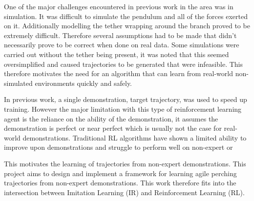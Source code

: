 One of the major challenges encountered in previous work in the area was in simulation.
It was difficult to simulate the pendulum and all of the forces exerted on it.
Additionally modelling the tether wrapping around the branch proved to be extremely difficult.
Therefore several assumptions had to be made that didn't necessarily prove to be correct when done on real data.
Some simulations were carried out without the tether being present, it was noted that this seemed oversimplified and caused trajectories to be generated that were infeasible.
This therefore motivates the need for an algorithm that can learn from real-world non-simulated environments quickly and safely.

In previous work, a single demonstration, target trajectory, was used to speed up training.
However the major limitation with this type of reinforcement learning agent is the reliance on the ability of the demonstration, it assumes the demonstration is perfect or near perfect which is usually not the case for real-world demonstrations.
Traditional RL algorithms have shown a limited ability to improve upon demonstrations and struggle to perform well on non-expert or 

This motivates the learning of trajectories from non-expert demonstrations.
This project aims to design and implement a framework for learning agile perching trajectories from non-expert demonstrations.
This work therefore fits into the intersection between Imitation Learning (IR) and Reinforcement Learning (RL).